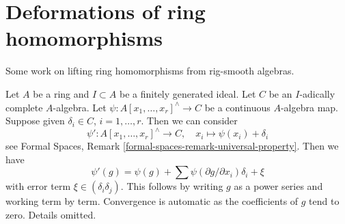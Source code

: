 \section{Deformations of ring homomorphisms}
\label{section-defos-ring-maps}

\noindent
Some work on lifting ring homomorphisms from rig-smooth algebras.

\begin{remark}
\label{remark-linear-approximation}
Let $A$ be a ring and $I \subset A$ be a finitely generated ideal.
Let $C$ be an $I$-adically complete $A$-algebra.
Let $\psi : A[x_1, \ldots, x_r]^\wedge \to C$ be a continuous
$A$-algebra map. Suppose given $\delta_i \in C$, $i = 1, \ldots, r$.
Then we can consider
$$
\psi' : A[x_1, \ldots, x_r]^\wedge \to C,\quad
x_i \longmapsto \psi(x_i) + \delta_i
$$
see Formal Spaces, Remark \ref{formal-spaces-remark-universal-property}.
Then we have
$$
\psi'(g) = \psi(g) + \sum \psi(\partial g/\partial x_i)\delta_i + \xi
$$
with error term $\xi \in (\delta_i\delta_j)$. This follows by
writing $g$ as a power series and working term by term. Convergence
is automatic as the coefficients of $g$ tend to zero.
Details omitted.
\end{remark}

